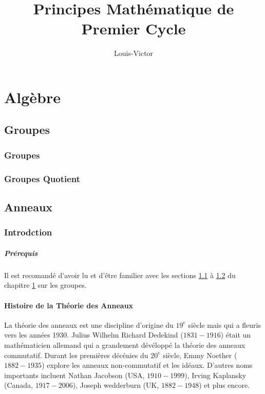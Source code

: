 \documentclass{book}
\title{Principes Mathématique de Premier Cycle}
\author{Louis-Victor}
\theoremstyle{plain}
\theoremstyle{definition}
\begin{document}
\maketitle
\date{}
\tableofcontents
\newpage
\part{Algèbre}
\chapter{Groupes}
\label{ch:group}

\section{Groupes}
\label{sec:group-group}
\section{Groupes Quotient}
\label{sec:group-quotients}

\label{part:alg}
\chapter{Anneaux}
\label{ch:ring}
\section{Introdction}
\label{sec:ring-intro}

\subsubsection{Prérequis}
Il est recomandé d'avoir lu et d'être familier avec les sections \ref{sec:group-group} à \ref{sec:group-quotients} du chapitre \ref{ch:group} sur les groupes.

\subsection{Histoire de la Théorie des Anneaux}
La théorie des anneaux est une discipline d'origine du $19^e$ siècle mais qui a fleuris vers les années 1930. Julius Wilhelm Richard Dedekind ($1831-1916$) était un mathématicien allemand qui a grandement dévéloppé la théorie des anneaux commutatif. Durant les premières décénies du $20^e$ siècle, Emmy Noether ($1882-1935$) explore les anneaux non-commutatif et les idéaux. D'autres noms importants incluent Nathan Jacobson (USA, $1910-1999$), Irving Kaplansky (Canada, $1917-2006$), Joseph wedderburn (UK, $1882-1948$) et plus encore.
\end{document}
